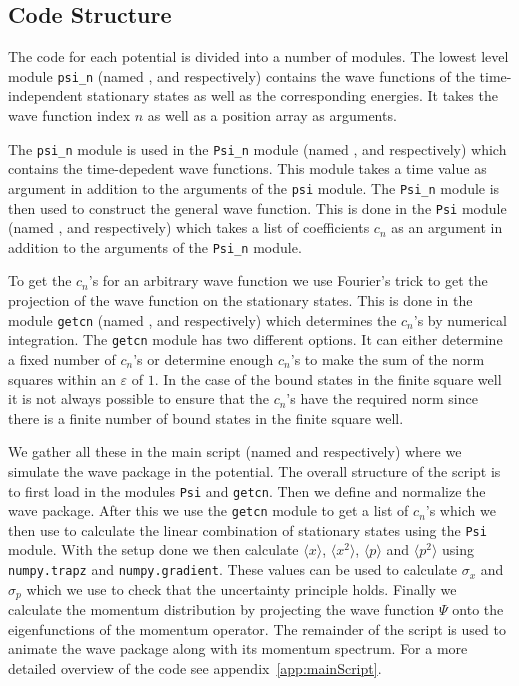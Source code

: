 \documentclass[12pt,a4paper]{article}
\renewcommand{\epsilon}{\varepsilon}
\begin{document}
\subsection{Code Structure}
The code for each potential is divided into a number of modules. The lowest level module \verb!psi_n! (named ,  and  respectively) contains the wave functions of the time-independent stationary states as well as the corresponding energies. It takes the wave function index $n$ as well as a position array as arguments.

The \verb!psi_n! module is used in the \verb!Psi_n! module (named ,  and  respectively) which contains the time-depedent wave functions. This module takes a time value as argument in addition to the arguments of the \verb!psi! module.  The \verb!Psi_n! module is then used to construct the general wave function. This is done in the \verb!Psi! module (named ,  and  respectively) which takes a list of coefficients $c_n$ as an argument in addition to the arguments of the \verb!Psi_n! module.

To get the $c_n$'s for an arbitrary wave function we use Fourier's trick to get the projection of the wave function on the stationary states. This is done in the module \verb!getcn! (named ,  and  respectively) which determines the $c_n$'s by numerical integration. The \verb!getcn! module has two different options. It can either determine a fixed number of $c_n$'s or determine enough $c_n$'s to make the sum of the norm squares within an $\epsilon$ of $1$. In the case of the bound states in the finite square well it is not always possible to ensure that the $c_n$'s have the required norm since there is a finite number of bound states in the finite square well.

We gather all these in the main script (named  and  respectively) where we simulate the wave package in the potential.	The overall structure of the script is to first load in the modules \verb!Psi! and \verb!getcn!. Then we define and normalize the wave package. After this we use the \verb!getcn! module to get a list of $c_n$'s which we then use to calculate the linear combination of stationary states using the \verb!Psi! module. With the setup done we then calculate $\langle x \rangle$, $\langle x^2 \rangle$, $\langle p \rangle$ and $\langle p^2 \rangle$ using \lstinline{numpy.trapz} and \lstinline{numpy.gradient}. These values can be used to calculate $\sigma_x$ and $\sigma_p$ which we use to check that the uncertainty principle holds. Finally we calculate the momentum distribution by projecting the wave function $\Psi$ onto the eigenfunctions of the momentum operator. The remainder of the script is used to animate the wave package along with its momentum spectrum. For a more detailed overview of the code see appendix~\ref{app:mainScript}.
\end{document}
